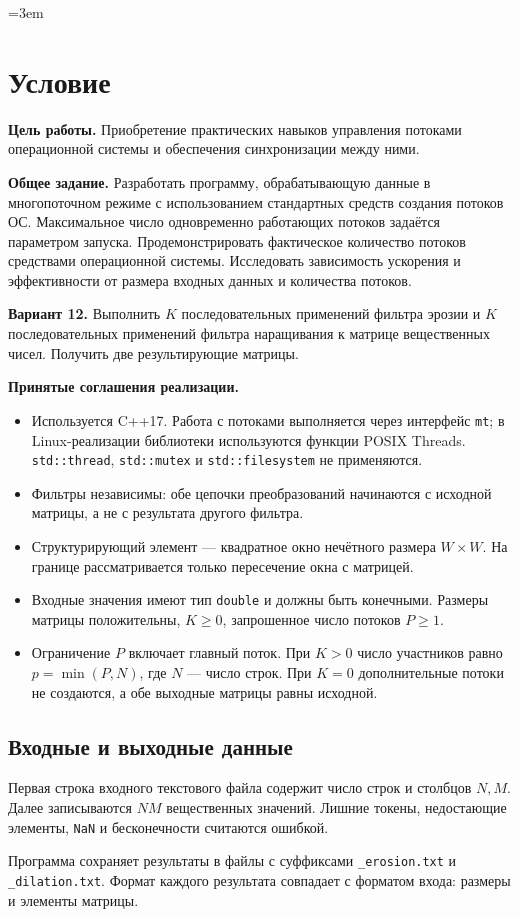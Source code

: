 \begingroup
\emergencystretch=3em
\section{Условие}
\textbf{Цель работы.} Приобретение практических навыков управления потоками
операционной системы и обеспечения синхронизации между ними.

\textbf{Общее задание.} Разработать программу, обрабатывающую данные
в многопоточном режиме с использованием стандартных средств создания
потоков ОС. Максимальное число одновременно работающих потоков задаётся
параметром запуска. Продемонстрировать фактическое количество потоков
средствами операционной системы. Исследовать зависимость ускорения
и эффективности от размера входных данных и количества потоков.

\textbf{Вариант 12.} Выполнить \(K\) последовательных применений фильтра эрозии
и \(K\) последовательных применений фильтра наращивания к матрице
вещественных чисел. Получить две результирующие матрицы.

\textbf{Принятые соглашения реализации.}
\begin{itemize}
\item Используется C++17. Работа с потоками выполняется через интерфейс
\texttt{mt}; в Linux-реализации библиотеки используются функции POSIX Threads.
\texttt{std::thread}, \texttt{std::mutex} и \texttt{std::filesystem} не применяются.
\item Фильтры независимы: обе цепочки преобразований начинаются с исходной
матрицы, а не с результата другого фильтра.
\item Структурирующий элемент --- квадратное окно нечётного размера
\(W\times W\). На границе рассматривается только пересечение окна с матрицей.
\item Входные значения имеют тип \texttt{double} и должны быть конечными.
Размеры матрицы положительны, \(K\geq0\), запрошенное число потоков \(P\geq1\).
\item Ограничение \(P\) включает главный поток. При \(K>0\) число участников
равно \(p=\min(P,N)\), где \(N\) --- число строк. При \(K=0\) дополнительные
потоки не создаются, а обе выходные матрицы равны исходной.
\end{itemize}

\subsection{Входные и выходные данные}
Первая строка входного текстового файла содержит число строк и столбцов
\(N,M\). Далее записываются \(NM\) вещественных значений. Лишние токены,
недостающие элементы, \texttt{NaN} и бесконечности считаются ошибкой.

Программа сохраняет результаты в файлы с суффиксами
\texttt{\_erosion.txt} и \texttt{\_dilation.txt}. Формат каждого результата
совпадает с форматом входа: размеры и элементы матрицы.
\clearpage
\endgroup
